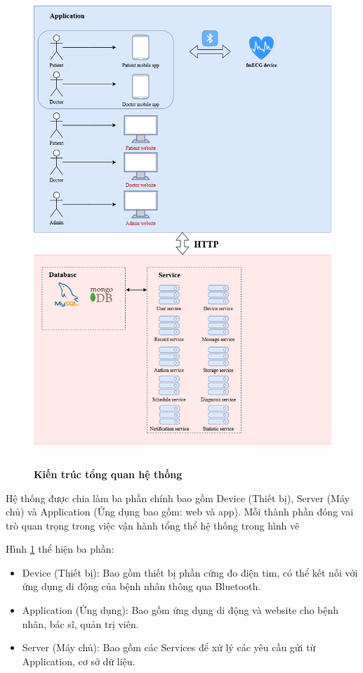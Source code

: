 \begin{figure}[H]
  \centering
  \includegraphics[width=12cm,height=18cm]{Images/System/fmECG_architecture-System_Architecture.drawio.png}
  \caption[Kiến trúc tổng quan hệ thống]{\bfseries \fontsize{12pt}{0pt}\selectfont Kiến trúc tổng quan hệ thống}
  \label{fmECG_architecture-System} %
\end{figure}
Hệ thống được chia làm ba phần chính bao gồm Device (Thiết bị), Server (Máy chủ) và Application (Ứng dụng bao gồm: web và app).
Mỗi thành phần đóng vai trò quan trọng trong việc vận hành tổng thể hệ thống trong hình vẽ

Hình \ref{fmECG_architecture-System} thể hiện ba phần: 

\begin{adjustwidth}{1.5em}{}
\begin{itemize}
  \item Device (Thiết bị): Bao gồm thiết bị phần cứng đo điện tim, có thể kết nối với ứng dụng di động của bệnh nhân thông qua Bluetooth.
  \item Application (Ứng dụng): Bao gồm ứng dụng di động và website cho bệnh nhân, bác sĩ, quản trị viên.
  \item Server (Máy chủ): Bao gồm các Services để xử lý các yêu cầu gửi từ Application, cơ sở dữ liệu.
\end{itemize}
\end{adjustwidth}

